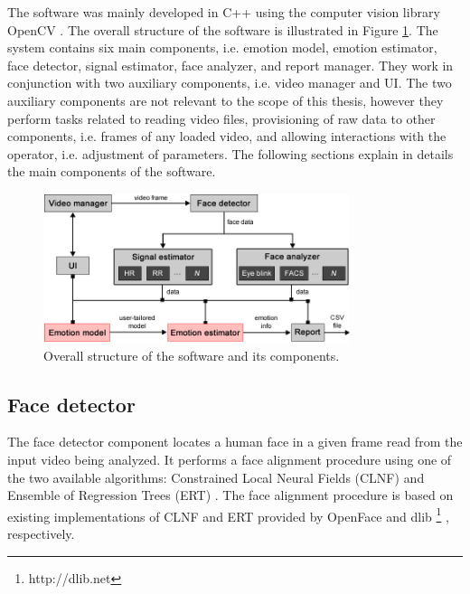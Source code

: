 The software was mainly developed in C++ using the computer vision library OpenCV \parencite{opencv_library}. The overall structure of the software is illustrated in Figure \ref{fig:tool-overall-structure}. The system contains six main components, i.e. emotion model, emotion estimator, face detector, signal estimator, face analyzer, and report manager. They work in conjunction with two auxiliary components, i.e. video manager and UI. The two auxiliary components are not relevant to the scope of this thesis, however they perform tasks related to reading video files, provisioning of raw data to other components, i.e. frames of any loaded video, and allowing interactions with the operator, i.e. adjustment of parameters. The following sections explain in details the main components of the software.

\begin{figure}
    \centering
    \includegraphics[width=0.8\textwidth]{Content/figures/tool-overall-structure.png}
    \caption{Overall structure of the software and its components.}
    \label{fig:tool-overall-structure}
\end{figure}

\subsection{Face detector}

The face detector component locates a human face in a given frame read from the input video being analyzed. It performs a face alignment procedure using one of the two available algorithms: Constrained Local Neural Fields (CLNF) \parencite{baltrusaitis2013constrained} and Ensemble of Regression Trees (ERT) \parencite{kazemi2014one}. The face alignment procedure is based on existing implementations of CLNF and ERT provided by OpenFace \parencite{baltruvsaitis2016openface} and dlib \footnote{http://dlib.​net} \parencite{dlib09}, respectively.

